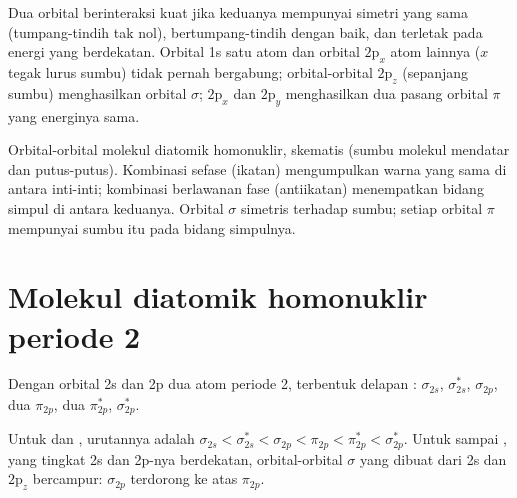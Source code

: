 Dua orbital berinteraksi kuat jika keduanya mempunyai simetri yang sama
(tumpang-tindih tak nol), bertumpang-tindih dengan baik, dan terletak pada
energi yang berdekatan. Orbital 1s satu atom dan orbital $2\mathrm p_x$ atom
lainnya ($x$ tegak lurus sumbu) tidak pernah bergabung; orbital-orbital
$2\mathrm p_z$ (sepanjang sumbu) menghasilkan orbital $\sigma$; $2\mathrm p_x$
dan $2\mathrm p_y$ menghasilkan dua pasang orbital $\pi$ yang energinya sama.

\begin{omfigure}

{\small Orbital-orbital molekul diatomik homonuklir, skematis (sumbu molekul
mendatar dan putus-putus). Kombinasi sefase (ikatan) mengumpulkan warna
yang sama di antara inti-inti; kombinasi berlawanan fase (antiikatan)
menempatkan bidang simpul di antara keduanya. Orbital $\sigma$ simetris
terhadap sumbu; setiap orbital $\pi$ mempunyai sumbu itu pada bidang
simpulnya.}
\end{omfigure}

\section{Molekul diatomik homonuklir periode 2}

Dengan orbital 2s dan 2p dua atom periode 2, terbentuk delapan : $\sigma_{2s}$, $\sigma^*_{2s}$, $\sigma_{2p}$, dua $\pi_{2p}$, dua
$\pi^*_{2p}$, $\sigma^*_{2p}$.

\begin{proposition}[Pencampuran s--p]\label{prop:b2:diatomic-mos:sp-mixing}
Untuk  dan , urutannya adalah $\sigma_{2s} < \sigma^*_{2s} < \sigma_{2p} < \pi_{2p} <
\pi^*_{2p} < \sigma^*_{2p}$. Untuk  sampai , yang tingkat 2s
dan 2p-nya berdekatan, orbital-orbital $\sigma$ yang dibuat dari 2s dan
$2\mathrm p_z$ bercampur: $\sigma_{2p}$ terdorong ke atas $\pi_{2p}$.
\end{proposition}

